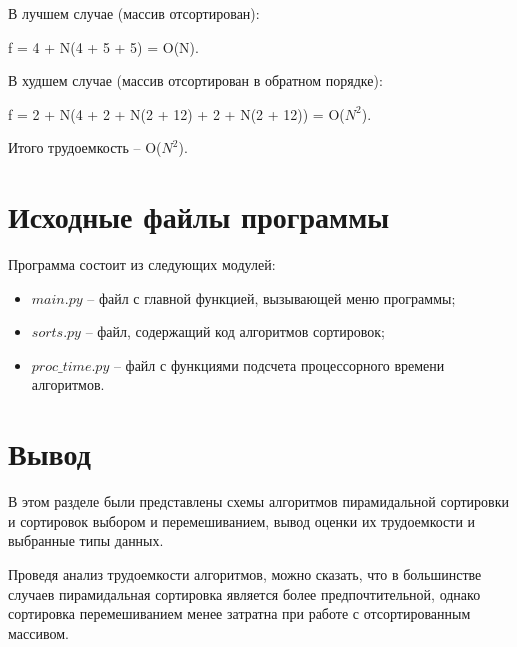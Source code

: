     В лучшем случае (массив отсортирован):

    f = 4 + N(4 + 5 + 5) = O(N).
    
    В худшем случае (массив отсортирован в обратном порядке):
    
    f = 2 + N(4 + 2 + N(2 + 12) + 2 + N(2 + 12)) = O($N^2$).
     
    Итого трудоемкость -- O($N^2$).
    



\section{Исходные файлы программы}
Программа состоит из следующих модулей:
\begin{itemize}[label=---]
	\item $main.py$ -- файл с главной функцией, вызывающей меню программы;
    \item $sorts.py$ -- файл, содержащий код алгоритмов сортировок;
    \item $proc\_time.py$ -- файл с функциями подсчета процессорного времени алгоритмов.
\end{itemize}

\section*{Вывод}
В этом разделе были представлены схемы алгоритмов пирамидальной сортировки и сортировок выбором и перемешиванием, вывод оценки их трудоемкости и выбранные типы данных.

Проведя анализ трудоемкости алгоритмов, можно сказать, что в большинстве случаев пирамидальная сортировка является более предпочтительной, однако сортировка перемешиванием менее затратна при работе с отсортированным массивом.
